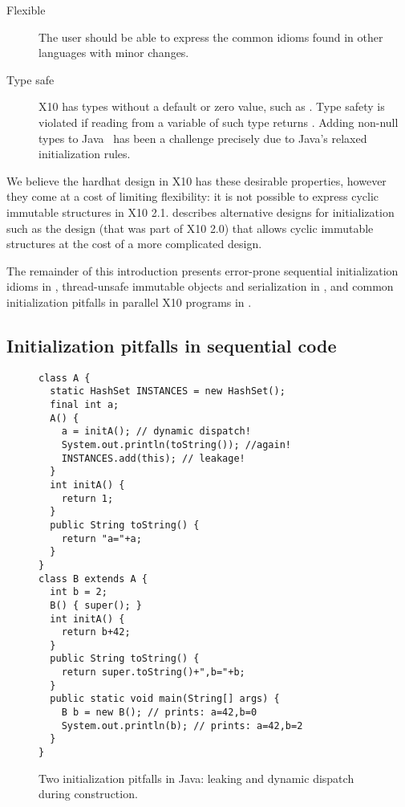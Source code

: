 \begin{description}
  \item[Flexible]
    The user should be able to express the common idioms
        found in other languages with minor changes.

  \item[Type safe]
    X10 has types without a default or zero value, such as .
    Type safety is violated if reading from a variable of such type returns .
    Adding non-null types to Java~\cite{Fahndrich:2003:DCN:949305.949332,Fahndrich:2007:EOI:1297027.1297052,XinQi:2009}
        has been a challenge precisely due to
        Java's relaxed initialization rules.
\end{description}
We believe the hardhat design in X10 has these desirable properties,
    however they come at a cost of limiting flexibility:
    it is not possible to express cyclic immutable structures in X10 2.1.
 describes alternative designs for initialization
    such as the  design (that was part of X10 2.0) that allows cyclic immutable structures
    at the cost of a more complicated design.

The remainder of this introduction
    presents error-prone sequential initialization idioms in ,
    thread-unsafe immutable objects and serialization in , and
    common initialization pitfalls in parallel X10 programs in .

\subsection{Initialization pitfalls in sequential code}
\label{Section:Initialization-pitfalls}

\begin{figure}
\begin{lstlisting}
class A {
  static HashSet INSTANCES = new HashSet();
  final int a;
  A() {
    a = initA(); // dynamic dispatch!
    System.out.println(toString()); //again!
    INSTANCES.add(this); // leakage!
  }
  int initA() {
    return 1;
  }
  public String toString() {
    return "a="+a;
  }
}
class B extends A {
  int b = 2;
  B() { super(); }
  int initA() {
    return b+42;
  }
  public String toString() {
    return super.toString()+",b="+b;
  }
  public static void main(String[] args) {
    B b = new B(); // prints: a=42,b=0
    System.out.println(b); // prints: a=42,b=2
  }
}
\end{lstlisting}
\caption{Two initialization pitfalls in Java:
    leaking \this and dynamic dispatch during construction.}
\label{Figure:TwoPitfalls}
\end{figure}

